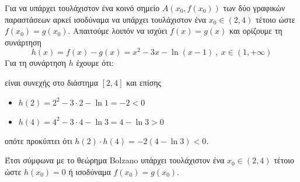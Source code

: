Για να υπάρχει τουλάχιστον ένα κοινό σημείο $ A(x_0,f(x_0)) $ των δύο γραφικών παραστάσεων αρκεί ισοδύναμα να υπάρχει τουλάχιστον ένα $ x_0\in(2,4) $ τέτοιο ώστε $ f(x_0)=g(x_0) $. Απαιτούμε λοιπόν να ισχύει $ f(x)=g(x) $ και ορίζουμε τη συνάρτηση
\[ h(x)=f(x)-g(x)=x^2-3x-\ln{(x-1)}\ ,\ x\in(1,+\infty) \]
Για τη συνάρτηση $ h $ έχουμε ότι:
\begin{rlist}
\item είναι συνεχής στο διάστημα $ [2,4] $ και επίσης
\item \begin{itemize}
\item $ h(2)=2^2-3\cdot2-\ln1=-2<0 $
\item $ h(4)=4^2-3\cdot4-\ln{3}=4-\ln{3}>0 $
\end{itemize}
οπότε προκύπτει ότι $ h(2)\cdot h(4)=-2(4-\ln3)<0 $.
\end{rlist}
Έτσι σύμφωνα με το θεώρημα Bolzano υπάρχει τουλάχιστον ένα $ x_0\in(2,4) $ τέτοιο ώστε $ h(x_0)=0 $ ή ισοδύναμα $ f(x_0)=g(x_0) $.
